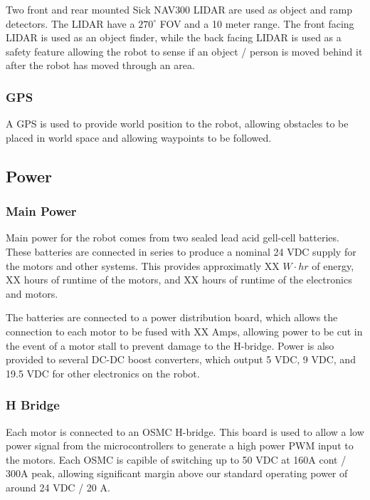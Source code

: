 Two front and rear mounted Sick NAV300 LIDAR are used as object and ramp detectors. The LIDAR have a $270^{\circ}$ FOV and a 10 meter range. The front facing LIDAR is used as an object finder, while the back facing LIDAR is used as a safety feature allowing the robot to sense if an object / person is moved behind it after the robot has moved through an area.

\subsubsection{GPS}

A GPS is used to provide world position to the robot, allowing obstacles to be placed in world space and allowing waypoints to be followed.

\subsection{Power}

\subsubsection{Main Power}

Main power for the robot comes from two sealed lead acid gell-cell batteries. These batteries are connected in series to produce a nominal 24 VDC supply for the motors and other systems. This provides approximatly XX $W \cdot hr$ of energy, XX hours of runtime of the motors, and XX hours of runtime of the electronics and motors.

The batteries are connected to a power distribution board, which allows the connection to each motor to be fused with XX Amps, allowing power to be cut in the event of a motor stall to prevent damage to the H-bridge. Power is also provided to several DC-DC boost converters, which output 5 VDC, 9 VDC, and 19.5 VDC for other electronics on the robot.

\subsubsection{H Bridge}

Each motor is connected to an OSMC H-bridge. This board is used to allow a low power signal from the microcontrollers to generate a high power PWM input to the motors. Each OSMC is capible of switching up to 50 VDC at 160A cont / 300A peak, allowing significant margin above our standard operating power of around 24 VDC / 20 A.

